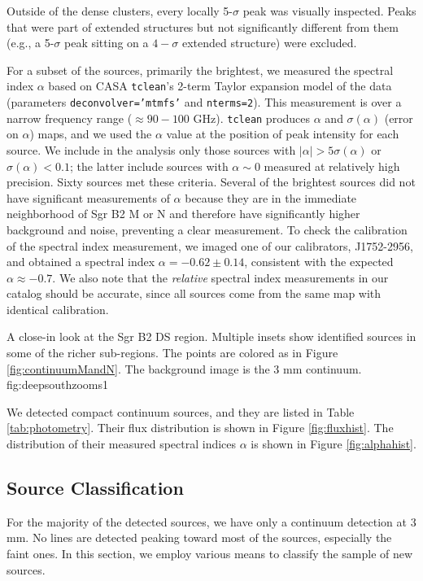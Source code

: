 \documentclass[twocolumn]{aastex61}
\begin{document}
Outside of the dense clusters, every locally 5-$\sigma$ peak was visually
inspected.  Peaks that were part of extended structures but not significantly
different from them (e.g., a 5-$\sigma$ peak sitting on a $4-\sigma$ extended
structure) were excluded.


For a subset of the sources, primarily the brightest, we measured the spectral
index $\alpha$ based on CASA \texttt{tclean}'s  2-term Taylor expansion model
of the data (parameters \texttt{deconvolver='mtmfs'} and \texttt{nterms=2}).
This measurement is over a narrow frequency range ($\approx90-100$ GHz).
\texttt{tclean} produces $\alpha$ and $\sigma(\alpha)$ (error on $\alpha$)
maps, and we used the $\alpha$ value at the position of peak intensity for each
source.  We include in the analysis only those sources with $|\alpha| > 5
\sigma(\alpha)$ or $\sigma(\alpha) < 0.1$; the latter include sources with
$\alpha\sim0$ measured at relatively high precision.  Sixty sources met these
criteria. Several of the brightest sources did not have significant
measurements of $\alpha$ because they are in the immediate neighborhood of Sgr
B2 M or N and therefore have significantly higher background and noise,
preventing a clear measurement.  To check the calibration of the spectral index
measurement, we imaged one of our calibrators, J1752-2956, and obtained a
spectral index $\alpha=-0.62\pm0.14$, consistent with the expected
$\alpha\approx-0.7$.  We also note that the \emph{relative} spectral index
measurements in our catalog should be accurate, since all sources come from the
same map with identical calibration.

{A close-in look at the Sgr B2 DS region.  Multiple insets show identified sources
in some of the richer sub-regions.  The points are colored as in Figure
\ref{fig:continuumMandN}.  The background image is the 3 mm continuum.}
{fig:deepsouthzooms}{1}{\textwidth}

We detected \ncores compact continuum sources, and they are listed
in Table \ref{tab:photometry}.  Their flux distribution is
shown in Figure \ref{fig:fluxhist}.  The distribution of their measured
spectral indices $\alpha$ is shown in Figure \ref{fig:alphahist}.


\subsection{Source Classification}
\label{sec:classification}
For the majority of the detected sources, we have only a continuum detection at
3 mm.  No lines are detected peaking toward most of the sources, especially the
faint ones.  In this section, we employ various means to classify the sample of
new sources.
\end{document}
